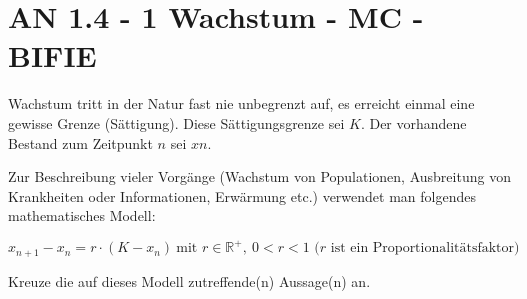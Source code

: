 \section{AN 1.4 - 1 Wachstum - MC - BIFIE}


\begin{beispiel}[AN 1.4]{1} %
Wachstum tritt in der Natur fast nie unbegrenzt auf, es erreicht einmal eine gewisse Grenze (Sättigung). Diese Sättigungsgrenze sei $K$. Der vorhandene Bestand zum Zeitpunkt $n$ sei $xn$.

Zur Beschreibung vieler Vorgänge (Wachstum von Populationen, Ausbreitung von Krankheiten
oder Informationen, Erwärmung etc.) verwendet man folgendes mathematisches Modell:

\[x_{n+1} - x_n = r \cdot (K - x_n)~ \text {mit } r \in \mathbb{R}^+,~ 0 < r < 1 \text{ ($r$ ist ein Proportionalitätsfaktor)} \]

Kreuze die auf dieses Modell zutreffende(n) Aussage(n) an.

\end{beispiel}